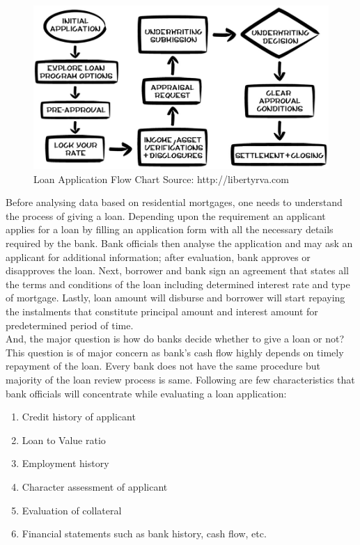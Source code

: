 {\begin{figure}
\includegraphics[width=\textwidth]{LAP.jpg}
\caption{Loan Application Flow Chart  
Source: http://libertyrva.com}
\end{figure}

Before analysing data based on residential mortgages, one needs to understand the process of giving a loan. Depending upon the requirement an applicant applies for a loan by filling an application form with all the necessary details required by the bank. Bank officials then analyse the application and may ask an applicant for additional information; after evaluation, bank approves or disapproves the loan. Next, borrower and bank sign an agreement that states all the terms and conditions of the loan including determined interest rate and type of mortgage. Lastly, loan amount will disburse and borrower will start repaying the instalments that constitute principal amount and interest amount for predetermined period of time.\\

And, the major question is how do banks decide whether to give a loan or not? This question is of major concern as bank's cash flow highly depends on timely repayment of the loan. Every bank does not have the same procedure but majority of the loan review process is same. Following are few characteristics that bank officials will concentrate while evaluating a loan application:
\begin{enumerate}
	\item Credit history of applicant
	\item Loan to Value ratio
	\item Employment history
	\item Character assessment of applicant
	\item Evaluation of collateral
	\item Financial statements such as bank history, cash flow, etc. 
\end{enumerate}

}
